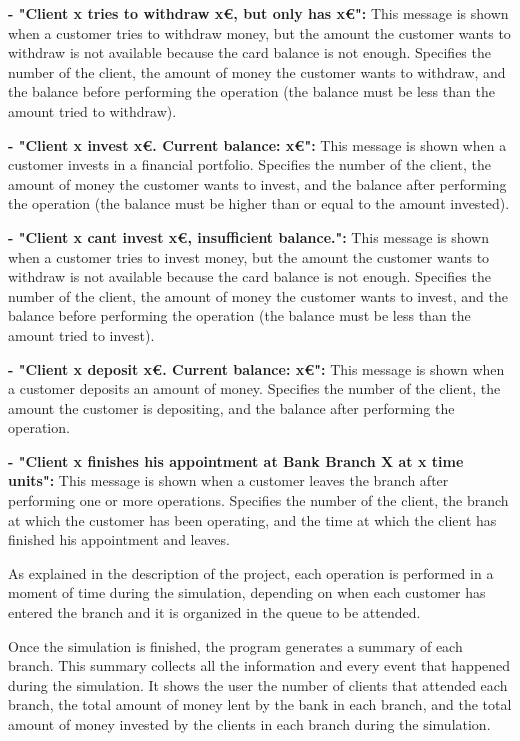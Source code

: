 \documentclass[titlepage, 12pt]{article}
\begin{document}
\textbf{- "Client x tries to withdraw x€, but only has x€":} This message is shown when a customer tries to withdraw money, but the amount the customer wants to withdraw is not available because the card balance is not enough. Specifies the number of the client, the amount of money the customer wants to withdraw, and the balance before performing the operation (the balance must be less than the amount tried to withdraw).

\textbf{- "Client x invest x€. Current balance: x€":} This message is shown when a customer invests in a financial portfolio. Specifies the number of the client, the amount of money the customer wants to invest, and the balance after performing the operation (the balance must be higher than or equal to the amount invested).

\textbf{- "Client x cant invest x€, insufficient balance.":} This message is shown when a customer tries to invest money, but the amount the customer wants to withdraw is not available because the card balance is not enough. Specifies the number of the client, the amount of money the customer wants to invest, and the balance before performing the operation (the balance must be less than the amount tried to invest).

\textbf{- "Client x deposit x€. Current balance: x€":} This message is shown when a customer deposits an amount of money. Specifies the number of the client, the amount the customer is depositing, and the balance after performing the operation.

\textbf{- "Client x finishes his appointment at Bank Branch X at x time units":} This message is shown when a customer leaves the branch after performing one or more operations. Specifies the number of the client, the branch at which the customer has been operating, and the time at which the client has finished his appointment and leaves.

As explained in the description of the project, each operation is performed in a moment of time during the simulation, depending on when each customer has entered the branch and it is organized in the queue to be attended.

Once the simulation is finished, the program generates a summary of each branch. This summary collects all the information and every event that happened during the simulation. It shows the user the number of clients that attended each branch, the total amount of money lent by the bank in each branch, and the total amount of money invested by the clients in each branch during the simulation. 
\end{document}
